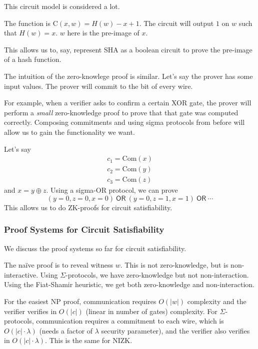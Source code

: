 
This circuit model is considered a lot.
\begin{example}
    The function is $\mathrm{C}(x,w) = H(w) - x + 1$. The circuit will output $1$ on $w$ such that $H(w) = x$. $w$ here is the pre-image of $x$.

    This allows us to, say, represent SHA as a boolean circuit to prove the pre-image of a hash function.
\end{example}

The intuition of the zero-knowlege proof is similar. Let's say the prover has some input values. The prover will commit to the bit of every wire.


For example, when a verifier asks to confirm a certain \textsf{XOR} gate, the prover will perform a \emph{small} zero-knowledge proof to prove that that gate was computed correctly. Composing commitments and using sigma protocols from before will allow us to gain the functionality we want.

Let's say
\begin{align*}
    c_1 = \mathrm{Com}(x) \\
    c_2 = \mathrm{Com}(y) \\
    c_3 = \mathrm{Com}(z)
\end{align*}
and $x = y\oplus z$. Using a sigma-\textsf{OR} protocol, we can prove
\[(y = 0, z = 0, x = 0)\ \mathsf{OR}\ (y = 0, z = 1, x = 1)\ \mathsf{OR}\ \cdots\]
This allows us to do ZK-proofs for circuit satisfiability.

\subsubsection{Proof Systems for Circuit Satisfiability}
We discuss the proof systems so far for circuit satisfiability.


The na\"ive proof is to reveal witness $w$. This is not zero-knowledge, but is non-interactive. Using $\Sigma$-protocols, we have zero-knowledge but not non-interaction. Using the Fiat-Shamir heuristic, we get both zero-knowledge and non-interaction.

For the easiest \textsf{NP} proof, communication requires $O(|w|)$ complexity and the verifier verifies in $O(|c|)$ (linear in number of gates) complexity. For $\Sigma$-protocols, communication requires a commitment to each wire, which is $O(|c|\cdot \lambda)$ (needs a factor of $\lambda$ security parameter), and the verifier also verifies in $O(|c|\cdot \lambda)$. This is the same for NIZK.

